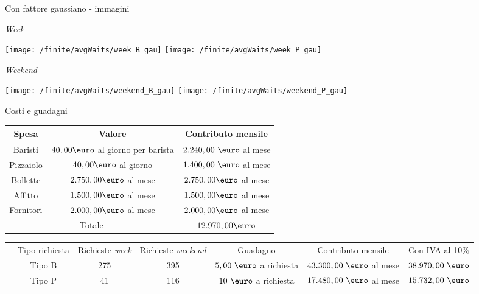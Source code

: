 \documentclass[xcolor=table]{beamer}
\begin{document}
\begin{frame}{Con fattore gaussiano - immagini}\justifying
\begin{minipage}{0.5\textwidth}
{\centering \textit{Week}\par}
\texttt{[image: /finite/avgWaits/week\_B\_gau]}
\texttt{[image: /finite/avgWaits/week\_P\_gau]}


\end{minipage}
\begin{minipage}{0.5\textwidth}
{\centering \textit{Weekend}\par}
\texttt{[image: /finite/avgWaits/weekend\_B\_gau]}
\texttt{[image: /finite/avgWaits/weekend\_P\_gau]}
\end{minipage}
\end{frame}

\begin{frame}[fragile]{Costi e guadagni}\justifying

\centering
\begin{adjustbox}{scale=0.55}
\begin{tabular}{|c|c|c|}
\hline
\cellcolor{cellcolor}Spesa & \cellcolor{cellcolor}Valore & \cellcolor{cellcolor}Contributo mensile \\
\hline
\hline
Baristi & $40,00 \mbox{\euro}$ al giorno per barista & $2.240,00\ \mbox{\euro}$ al mese \\
\hline
Pizzaiolo & $40,00 \mbox{\euro}$ al giorno & $1.400,00\ \mbox{\euro}$  al mese\\
\hline
Bollette & $2.750,00 \mbox{\euro}$ al mese & $2.750,00 \mbox{\euro}$ al mese \\
\hline
Affitto & $1.500,00 \mbox{\euro}$ al mese & $1.500,00 \mbox{\euro}$ al mese\\
\hline
Fornitori & $2.000,00 \mbox{\euro}$ al mese & $2.000,00 \mbox{\euro}$ al mese\\
\hline
\hline
\multicolumn{2}{|c|}{Totale} & \cellcolor{red!40} $12.970,00 \mbox{\euro}$\\
\hline

\end{tabular}
\end{adjustbox}

\bigskip

\begin{adjustbox}{width=\textwidth}
\begin{tabular}{|c|c|c|c|c|c|c|}
\cline{2-7}
\multicolumn{1}{c|}{} & 
\cellcolor{cellcolor}Tipo richiesta & \cellcolor{cellcolor}Richieste \textit{week} & \cellcolor{cellcolor}Richieste \textit{weekend} & \cellcolor{cellcolor}Guadagno & \cellcolor{cellcolor}Contributo mensile &
\cellcolor{cellcolor} Con IVA al 10\% \\
\cline{2-7}
\noalign{\vspace{0.5ex}}
\hline
\multicolumn{1}{|c|}{\cellcolor{cellcolor}} & Tipo B & 275 & 395 & $5,00\ \mbox{\euro}$ a richiesta & $43.300,00\ \mbox{\euro}$ al mese & $ 38.970,00\ \mbox{\euro}$ \\
\cline{2-7}
\multicolumn{1}{|c|}{\cellcolor{cellcolor}} & Tipo P & 41 & 116 & $10\ \mbox{\euro}$ a richiesta & $17.480,00\ \mbox{\euro}$ al mese & $ 15.732,00\ \mbox{\euro}$ \\
\cline{2-7}


\end{tabular}
\end{adjustbox}
\end{frame}
\end{document}
